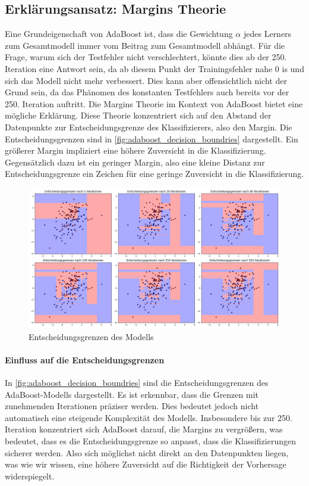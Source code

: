 \subsection{Erklärungsansatz: Margins Theorie}
Eine Grundeigenschaft von AdaBoost ist, dass die Gewichtung \(\alpha\) jedes Lerners zum Gesamtmodell immer vom Beitrag zum Gesamtmodell abhängt. Für die Frage, warum sich der Testfehler nicht verschlechtert, könnte dies ab der 250. Iteration eine Antwort sein, da ab diesem Punkt der Trainingsfehler nahe 0 is und sich das Modell nicht mehr verbessert. Dies kann aber offensichtlich nicht der Grund sein, da das Phänomen des konstanten Testfehlers auch bereits vor der 250. Iteration auftritt.
\newline
Die Margins Theorie im Kontext von AdaBoost bietet eine mögliche Erklärung. Diese Theorie konzentriert sich auf den Abstand der Datenpunkte zur Entscheidungsgrenze des Klassifizierers, also den Margin. Die Entscheidungsgrenzen sind in \autoref{fig:adaboost_decision_boundries} dargestellt. Ein größerer Margin impliziert eine höhere Zuversicht in die Klassifizierung. Gegensätzlich dazu ist ein geringer Margin, also eine kleine Distanz zur Entscheidungsgrenze ein Zeichen für eine geringe Zuversicht in die Klassifizierung.
\begin{figure}[h]
    \centering
    \includegraphics[width=\textwidth]{Images/AdaBoost_Multiple_Decision_Boundaries.png}
    \caption{Entscheidungsgrenzen des Modells}
    \label{fig:adaboost_decision_boundries}
\end{figure}
\paragraph{Einfluss auf die Entscheidungsgrenzen}
In \autoref{fig:adaboost_decision_boundries} sind die Entscheidungsgrenzen des AdaBoost-Modells dargestellt. Es ist erkennbar, dass die Grenzen mit zunehmenden Iterationen präziser werden. Dies bedeutet jedoch nicht automatisch eine steigende Komplexität des Modells. Insbesondere bis zur 250. Iteration konzentriert sich AdaBoost darauf, die Margins zu vergrößern, was bedeutet, dass es die Entscheidungsgrenze so anpasst, dass die Klassifizierungen sicherer werden. Also sich möglichst nicht direkt an den Datenpunkten liegen, was wie wir wissen, eine höhere Zuversicht auf die Richtigkeit der Vorhersage widerspiegelt.


